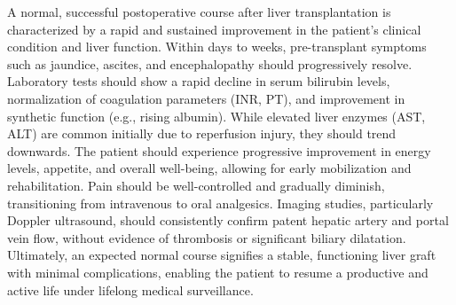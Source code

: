 A normal, successful postoperative course after liver transplantation is characterized by a rapid and sustained improvement in the patient's clinical condition and liver function. Within days to weeks, pre-transplant symptoms such as jaundice, ascites, and encephalopathy should progressively resolve. Laboratory tests should show a rapid decline in serum bilirubin levels, normalization of coagulation parameters (INR, PT), and improvement in synthetic function (e.g., rising albumin). While elevated liver enzymes (AST, ALT) are common initially due to reperfusion injury, they should trend downwards. The patient should experience progressive improvement in energy levels, appetite, and overall well-being, allowing for early mobilization and rehabilitation. Pain should be well-controlled and gradually diminish, transitioning from intravenous to oral analgesics. Imaging studies, particularly Doppler ultrasound, should consistently confirm patent hepatic artery and portal vein flow, without evidence of thrombosis or significant biliary dilatation. Ultimately, an expected normal course signifies a stable, functioning liver graft with minimal complications, enabling the patient to resume a productive and active life under lifelong medical surveillance.

